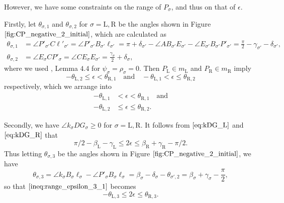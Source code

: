 \documentclass[11pt]{amsart}
\numberwithin{equation}{section}
\numberwithin{theorem}{section}
\newcommand{\Lt}{\ensuremath{\mathrm{L}}}
\newcommand{\Rt}{\ensuremath{\mathrm{R}}}
\begin{document}
However, we have some constraints on the range of $P_\sigma$, and thus on that of $\epsilon$.

Firstly, let $\theta_{\sigma ,1}$ and $\theta_{\sigma ,2}$ for $\sigma =\Lt ,\Rt$ be the angles shown in Figure $\ref{fig:CP_negative_2_initial}$,
which are calculated as
\begin{equation*}\label{eq:theta_sigma_12}
\begin{aligned}
\theta_{\sigma ,1}&=\angle P'_{\sigma'}C\ell'_{\sigma'}=\angle P'_{\sigma'}B_{\sigma'}\ell_{\sigma'}
=\pi +\delta_{\sigma'}-\angle AB_{\sigma'}E_{\sigma'}-\angle E_{\sigma'}B_{\sigma'}P'_{\sigma'}=\frac{\pi}{2}-\gamma_{\sigma'}-\delta_{\sigma'},\\
\theta_{\sigma ,2}&=\angle E_\sigma CP'_\sigma =\angle CE_\sigma E_{\sigma'}=\frac{\gamma_\sigma}{2}+\delta_\sigma ,
\end{aligned}
\end{equation*}
where we used \cite{Doi20}, Lemma $4.4$ for $\psi_\sigma =\rho_\sigma =0$.
Then $P_\Lt\in m_\Lt$ and $P_\Rt\in m_\Rt$ imply
\begin{equation*}
-\theta_{\Lt ,2}\leqslant\epsilon <\theta_{\Rt ,1}\quad\text{and}\quad-\theta_{\Lt ,1}<\epsilon\leqslant\theta_{\Rt ,2}
\end{equation*}
respectively, which we arrange into
\begin{align}
-\theta_{\Lt ,1}&<\epsilon <\theta_{\Rt ,1}\quad\text{and}\label{ineq:range_epsilon_1}\\
-\theta_{\Lt ,2}&\leqslant\epsilon\leqslant\theta_{\Rt ,2}.\label{ineq:range_epsilon_2}
\end{align}

Secondly, we have $\angle k_\sigma DG_\sigma\geqslant 0$ for $\sigma =\Lt ,\Rt$.
It follows from $\eqref{eq:kDG_L}$ and $\eqref{eq:kDG_R}$ that
\begin{equation}\label{ineq:range_epsilon_3_1}
\pi /2-\beta_\Lt -\gamma_\Lt\leqslant 2\epsilon\leqslant\beta_\Rt +\gamma_\Rt -\pi /2.
\end{equation}
Thus letting $\theta_{\sigma ,3}$ be the angles shown in Figure $\ref{fig:CP_negative_2_initial}$, we have
\begin{equation*}
\theta_{\sigma ,3}=\angle k_\sigma B_\sigma\ell_\sigma -\angle P'_\sigma B_\sigma\ell_\sigma
=\beta_\sigma -\delta_\sigma -\theta_{\sigma',2}=\beta_\sigma +\gamma_\sigma -\frac{\pi}{2},
\end{equation*}
so that $\eqref{ineq:range_epsilon_3_1}$ becomes
\begin{equation}\label{ineq:range_epsilon_3_2}
-\theta_{\Lt ,3}\leqslant 2\epsilon\leqslant\theta_{\Rt ,3}.
\end{equation}
\end{document}
